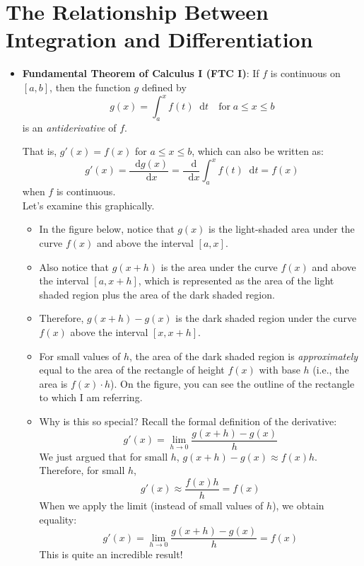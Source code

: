 \documentclass[11pt]{article}
\theoremstyle{definition}
\theoremstyle{remark}
\newcommand*\diff{\mathop{}\!\mathrm{d}}
\begin{document}
\section{The Relationship Between Integration and Differentiation}
\begin{itemize}
\item \textbf{Fundamental Theorem of Calculus I (FTC I)}: If $f$ is continuous on $[a,b]$, then the function $g$ defined by 
$$
g(x) = \int_a^x f(t) \diff t \quad \text{for} \; a\leq x \leq b
$$
is an \textit{antiderivative} of $f$. 

That is, $g'(x)=f(x)$ for $a\leq x \leq b$, which can also be written as:
$$
g'(x) = \frac{\diff g(x)}{\diff x} = \frac{\diff}{\diff x}\int_a^x f(t) \diff t = f(x)
$$
when $f$ is continuous. 
\\[15pt]
Let's examine this graphically. 
\begin{itemize}
\item In the figure below, notice that $g(x)$ is the light-shaded area under the curve $f(x)$ and above the interval $[a,x]$. 
\item Also notice that $g(x+h)$ is the area under the curve $f(x)$ and above the interval $[a,x+h]$, which is represented as the area of the light shaded region plus the area of the dark shaded region. 
\item Therefore, $g(x+h) - g(x)$ is the dark shaded region under the curve $f(x)$ above the interval $[x,x+h]$. 
\item For small values of $h$, the area of the dark shaded region is \textit{approximately} equal to the area of the rectangle of height $f(x)$ with base $h$ (i.e., the area is $f(x)\cdot h$). On the figure, you can see the outline of the rectangle to which I am referring. 
\item Why is this so special? Recall the formal definition of the derivative:
$$
g'(x) = \lim_{h \rightarrow 0} \frac{g(x+h)-g(x)}{h}  
$$
We just argued that for small $h$, $g(x+h) - g(x) \approx f(x)h$.
Therefore, for small $h$,
$$
g'(x) \approx \frac{f(x)h}{h}=f(x)
$$
When we apply the limit (instead of small values of $h$), we obtain equality:
$$
g'(x) = \lim_{h \rightarrow 0} \frac{g(x+h)-g(x)}{h} = f(x) 
$$
This is quite an incredible result!
\end{itemize}
\begin{center}

\end{center}
\end{itemize}
\end{document}
